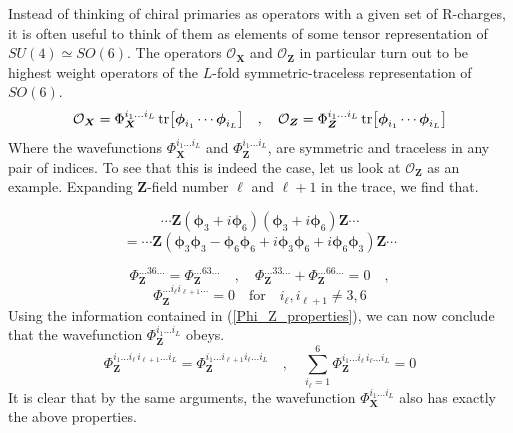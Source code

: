 Instead of thinking of chiral primaries as operators with a given set of R-charges, it is often useful to think of them as elements of some tensor representation of $SU(4) \simeq SO(6)$. The operators $\mathcal{O}_{\boldsymbol{X}}$ and $\mathcal{O}_{\boldsymbol{Z}}$ in particular turn out to be highest weight operators of the $L$-fold symmetric-traceless representation of $SO(6)$.
%
%
\begin{equation}
\mathcal{O}_{\boldsymbol{X}}
=
\Phi_{\boldsymbol{X}}^{i_1 \ldots i_L}
\tr[
\boldsymbol{\phi}_{i_1} \cdots \boldsymbol{\phi}_{i_L}
]
%
\quad , \quad
%
\mathcal{O}_{\boldsymbol{Z}}
=
\Phi_{\boldsymbol{Z}}^{i_1 \ldots i_L}
\tr[
\boldsymbol{\phi}_{i_1} \cdots \boldsymbol{\phi}_{i_L}
]
\end{equation}
%
%
Where the wavefunctions $\Phi_{\boldsymbol{X}}^{i_1 \ldots i_L}$ and $\Phi_{\boldsymbol{Z}}^{i_1 \ldots i_L}$, are symmetric and traceless in any pair of indices. To see that this is indeed the case, let us look at $\mathcal{O}_{\boldsymbol{Z}}$ as an example. Expanding ${\boldsymbol{Z}}$-field number $\ell$ and $\ell+1$ in the trace, we find that.

\newpage
%
%
\begin{equation*}
\cdots
{\boldsymbol{Z}}
(\boldsymbol{\phi}_3 + i \boldsymbol{\phi}_6) (\boldsymbol{\phi}_3 + i \boldsymbol{\phi}_6)
{\boldsymbol{Z}}
\cdots
\end{equation*}
%
%
\begin{equation}
=
\cdots
{\boldsymbol{Z}}
(
\boldsymbol{\phi}_3 \boldsymbol{\phi}_3 - \boldsymbol{\phi}_6 \boldsymbol{\phi}_6
+ i \boldsymbol{\phi}_3 \boldsymbol{\phi}_6 + i \boldsymbol{\phi}_6 \boldsymbol{\phi}_3
)
{\boldsymbol{Z}}
\cdots
\end{equation}
%
%

%
%
\begin{equation*}
\Phi_{\boldsymbol{Z}}^{\ldots 36 \ldots} = \Phi_{\boldsymbol{Z}}^{\ldots 63 \ldots}
%
\quad , \quad
%
\Phi_{\boldsymbol{Z}}^{\ldots 33 \ldots} + \Phi_{\boldsymbol{Z}}^{\ldots 66 \ldots} = 0
%
\quad ,
\end{equation*}
%
%
\begin{equation}\label{Phi_Z_properties}
\Phi_{\boldsymbol{Z}}^{\ldots i_\ell i_{\ell+1} \ldots} = 0
%
\quad \text{for} \quad
%
i_\ell, i_{\ell+1} \neq 3,6
\end{equation}
%
%
Using the information contained in (\ref{Phi_Z_properties}), we can now conclude that the wavefunction $\Phi_{\boldsymbol{Z}}^{i_1 \ldots i_L}$ obeys.
%
%
\begin{equation}
\Phi_{\boldsymbol{Z}}^{i_1 \ldots i_{\ell} \, i_{\ell+1} \ldots i_L}
=
\Phi_{\boldsymbol{Z}}^{i_1 \ldots i_{\ell+1} i_{\ell} \ldots i_L}
\quad , \quad
%
\sum_{i_{\ell}=1}^6
\Phi_{\boldsymbol{Z}}^{i_1 \ldots i_{\ell} \, i_{\ell} \ldots i_L}
=
0
\end{equation}
%
%
It is clear that by the same arguments, the wavefunction $\Phi_{\boldsymbol{X}}^{i_1 \ldots i_L}$ also has exactly the above properties.

